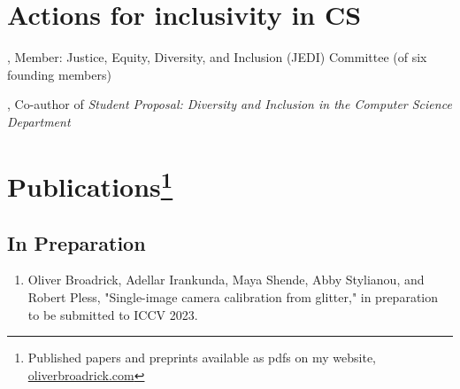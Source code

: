 \documentclass[letterpaper]{article}
\renewenvironment{itemize}{
  \begin{list}{}{
    \setlength{\leftmargin}{1.5em}
  }
}{
  \end{list}
}
\begin{document}

\section*{Actions for inclusivity in CS}
, Member: Justice, Equity, Diversity, and Inclusion (JEDI) Committee (of six founding members)

, Co-author of \emph{Student Proposal: Diversity and Inclusion in the Computer Science Department} 

\section*{Publications\footnote{Published papers and preprints available as pdfs on my website, \href{https://www.oliverbroadrick.com}{oliverbroadrick.com}}}

\subsection*{In Preparation}
\begin{enumerate}
\item
Oliver Broadrick, Adellar Irankunda, Maya Shende, Abby Stylianou, and Robert Pless, "Single-image camera calibration from glitter," in preparation to be submitted to ICCV 2023.
\end{enumerate}
\end{document}
